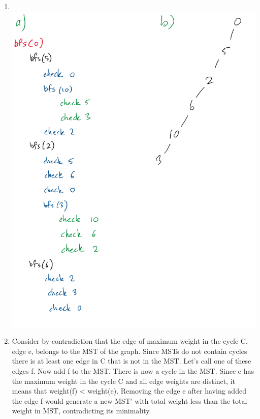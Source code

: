 \documentclass[11pt,fleqn]{article}
\begin{document}
\begin{enumerate}
	\item $~$\\
\includegraphics[scale=0.75]{Q3}
	\item Consider by contradiction that the edge of maximum weight in the cycle C, edge e, belongs to the MST of the graph.
Since MSTs do not contain cycles there is at least one edge in C that is not in the MST. Let's call one of these edges f.
Now add f to the MST. There is now a cycle in the MST. Since e has the maximum weight in the cycle C and all edge weights are distinct, it means that weight(f) < weight(e). 
Removing the edge e after having added the edge f would generate a new MST' with total weight less than the total weight in MST, contradicting its minimality.

\newpage


\end{enumerate}
\end{document}
